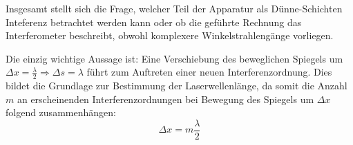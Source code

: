 Insgesamt stellt sich die Frage, welcher Teil der Apparatur als Dünne-Schichten Inteferenz betrachtet werden kann oder ob die geführte Rechnung das Interferometer beschreibt, obwohl komplexere Winkelstrahlengänge vorliegen. 

Die einzig wichtige Aussage ist: Eine Verschiebung des beweglichen Spiegels um \(\Delta x = \frac{\lambda}{2}\Rightarrow \Delta s=\lambda\) führt zum Auftreten einer neuen Interferenzordnung. Dies bildet die Grundlage zur Bestimmung der Laserwellenlänge, da somit die Anzahl \(m\) an erscheinenden Interferenzordnungen bei Bewegung des Spiegels um \(\Delta x\) folgend zusammenhängen:
\begin{equation}
    \Delta x=m\frac{\lambda}{2}
    \label{eq:Maximanzahl}
\end{equation}

\clearpage
